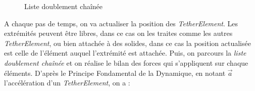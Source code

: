 				\begin{figure}[!htb]
					\centering
					\caption{Liste doublement chaînée}
					\label{fig:doubly_linked_list}
				\end{figure}

				A chaque pas de temps, on va actualiser la position des \textit{TetherElement}. Les extrémités peuvent être libres, dans ce cas on les traites comme les autres \textit{TetherElement}, ou bien attachée à des solides, dans ce cas la position actualisée est celle de l'élément auquel l'extrémité est attachée. Puis, on parcours la \textit{liste doublement chaînée} et on réalise le bilan des forces qui s'appliquent sur chaque éléments. D'après le Principe Fondamental de la Dynamique, en notant $\overrightarrow{a}$ l'accélération d'un \textit{TetherElement}, on a :


